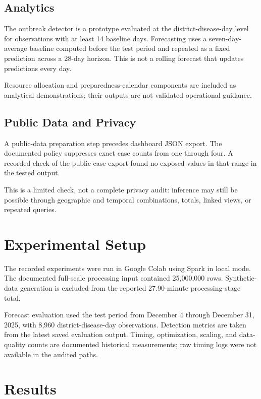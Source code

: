 \documentclass[conference]{IEEEtran}
\begin{document}
\subsection{Analytics}

The outbreak detector is a prototype evaluated at the district-disease-day level for observations with at least 14 baseline days. Forecasting uses a seven-day-average baseline computed before the test period and repeated as a fixed prediction across a 28-day horizon. This is not a rolling forecast that updates predictions every day.

Resource allocation and preparedness-calendar components are included as analytical demonstrations; their outputs are not validated operational guidance.

\subsection{Public Data and Privacy}

A public-data preparation step precedes dashboard JSON export. The documented policy suppresses exact case counts from one through four. A recorded check of the public case export found no exposed values in that range in the tested output.

This is a limited check, not a complete privacy audit: inference may still be possible through geographic and temporal combinations, totals, linked views, or repeated queries.

\section{Experimental Setup}

The recorded experiments were run in Google Colab using Spark in local mode. The documented full-scale processing input contained 25,000,000 rows. Synthetic-data generation is excluded from the reported 27.90-minute processing-stage total.

Forecast evaluation used the test period from December 4 through December 31, 2025, with 8,960 district-disease-day observations. Detection metrics are taken from the latest saved evaluation output. Timing, optimization, scaling, and data-quality counts are documented historical measurements; raw timing logs were not available in the audited paths.

\section{Results}
\end{document}
